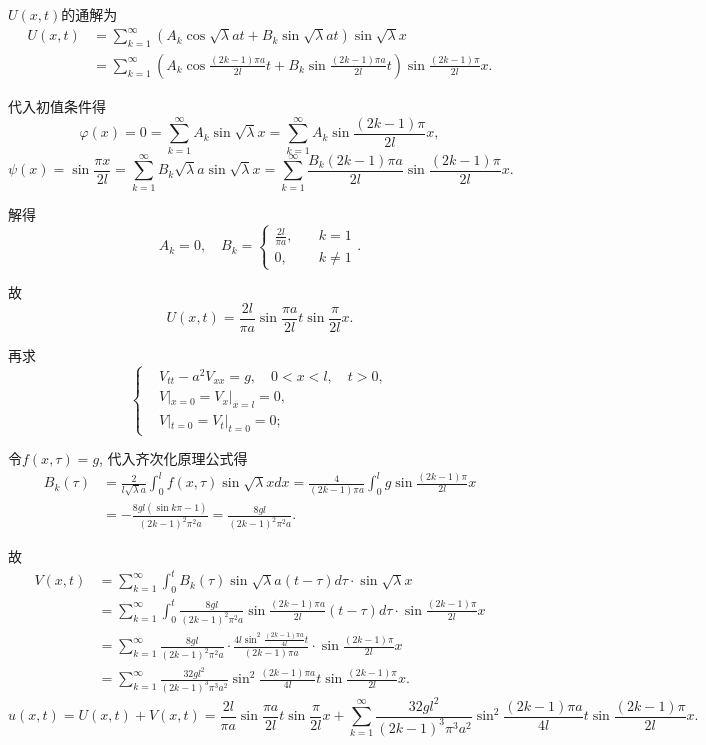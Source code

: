 \documentclass[11pt,a4paper]{article}
\begin{document}
$U(x,t)$的通解为
\begin{align*}
  U(x,t)
   & =\sum_{k=1}^\infty\left(A_k\cos\sqrt{\lambda}at+
  B_k\sin\sqrt{\lambda}at\right)\sin\sqrt{\lambda}x          \\
   & =\sum_{k=1}^\infty\left(A_k\cos\frac{(2k-1)\pi a}{2l}t+
  B_k\sin\frac{(2k-1)\pi a}{2l}t\right)\sin\frac{(2k-1)\pi}{2l}x.
\end{align*}

代入初值条件得
$$\varphi(x)=0=\sum_{k=1}^\infty A_k\sin\sqrt{\lambda}x=\sum_{k=1}^\infty A_k\sin\frac{(2k-1)\pi }{2l}x,$$
$$\psi(x)=\sin\frac{\pi x}{2l}=\sum_{k=1}^\infty B_k\sqrt{\lambda}a\sin\sqrt{\lambda}x=\sum_{k=1}^\infty \frac{B_k(2k-1)\pi a}{2l}\sin\frac{(2k-1)\pi}{2l}x.$$

解得
$$A_k=0,\quad B_k=\left\{\begin{aligned}\frac{2l}{\pi a}, &\quad k = 1 \\ 0, &\quad k\neq 1 \end{aligned}\right..$$

故
$$U(x,t)=\frac{2l}{\pi a}\sin\frac{\pi a}{2l}t\sin\frac{\pi}{2l}x.$$

再求
$$
  \left\{\begin{aligned}
     & V_{tt}-a^2V_{xx}=g, \quad 0<x<l,\quad t>0, \\
     & V|_{x=0}=V_x|_{x=l}=0,                     \\
     & V|_{t=0}=V_t|_{t=0}=0;
  \end{aligned}\right.
$$

令$f(x,\tau)=g$, 代入齐次化原理公式得
\begin{align*}
  B_k(\tau)
   & =\frac{2}{l\sqrt{\lambda}a}\int_0^lf(x,\tau)\sin\sqrt{\lambda}xdx=\frac{4}{(2k-1)\pi a}\int_0^lg\sin\frac{(2k-1)\pi}{2l}x \\
   & =-\frac{8gl(\sin k\pi -1)}{(2k-1)^2\pi^2a}=\frac{8gl}{(2k-1)^2\pi^2a}.
\end{align*}

故
\begin{align*}
  V(x,t) & =\sum_{k=1}^\infty\int_0^t B_k(\tau)\sin\sqrt{\lambda}a(t-\tau)d\tau\cdot\sin\sqrt{\lambda}x                                       \\
         & =\sum_{k=1}^\infty\int_0^t \frac{8gl}{(2k-1)^2\pi^2a}\sin\frac{(2k-1)\pi a}{2l}(t-\tau)d\tau\cdot\sin\frac{(2k-1)\pi}{2l}x         \\
         & =\sum_{k=1}^\infty\frac{8gl}{(2k-1)^2\pi^2a}\cdot\frac{4l\sin^2\frac{(2k-1)\pi a}{4l}t}{(2k-1)\pi a}\cdot\sin\frac{(2k-1)\pi}{2l}x \\
         & =\sum_{k=1}^\infty\frac{32gl^2}{(2k-1)^3\pi^3a^2}\sin^2\frac{(2k-1)\pi a}{4l}t\sin\frac{(2k-1)\pi}{2l}x.
\end{align*}
$$u(x,t)=U(x,t)+V(x,t)=\frac{2l}{\pi a}\sin\frac{\pi a}{2l}t\sin\frac{\pi}{2l}x+\sum_{k=1}^\infty\frac{32gl^2}{(2k-1)^3\pi^3a^2}\sin^2\frac{(2k-1)\pi a}{4l}t\sin\frac{(2k-1)\pi}{2l}x.$$
\end{document}
